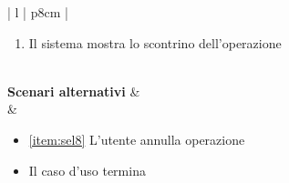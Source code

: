 \begin{center}
\begin{longtable}{{ | l | p{8cm} |}}
\begin{enumerate}
       \item Il sistema mostra lo scontrino dell'operazione
      \end{enumerate}\\\hline
      \textbf{Scenari alternativi} &  \\\hline
     & \begin{itemize}
       \item  \ref{item:sel8} L'utente annulla operazione
       \item Il caso d'uso termina
      \end{itemize}\\\hline
     \end{longtable}
\end{center}

